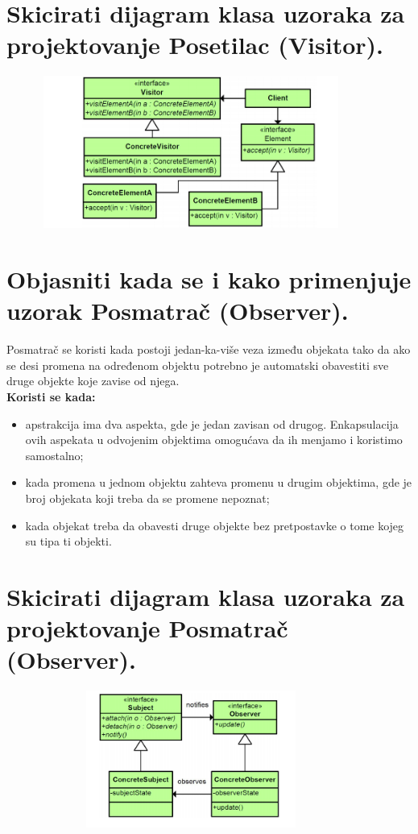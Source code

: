 \documentclass[a4paper]{article}
\begin{document}
\section{Skicirati dijagram klasa uzoraka za projektovanje Posetilac (Visitor).}
  \begin{figure}[H]
    \begin{center}
        \includegraphics[width=100mm,height=50mm]{Slike/dp_visitor.png}
    \end{center}
  \end{figure} 

\section{Objasniti kada se i kako primenjuje uzorak Posmatrač (Observer).}
  Posmatrač se koristi kada postoji jedan-ka-više veza između objekata tako da ako se desi promena 
  na određenom objektu potrebno je automatski obavestiti sve druge objekte koje zavise od njega.\\
  \textbf{Koristi se kada:}
  \begin{itemize}
    \item apstrakcija ima dva aspekta, gde je jedan zavisan od drugog. Enkapsulacija ovih aspekata
          u odvojenim objektima omogućava da ih menjamo i koristimo samostalno;
    \item kada promena u jednom objektu zahteva promenu u drugim objektima, gde je broj
          objekata koji treba da se promene nepoznat;
    \item kada objekat treba da obavesti druge objekte bez pretpostavke o tome kojeg su tipa ti objekti.
  \end{itemize}

\section{Skicirati dijagram klasa uzoraka za projektovanje Posmatrač (Observer).}
  \begin{figure}[H]
    \begin{center}
        \includegraphics[width=100mm,height=45mm]{Slike/dp_observer.png}
    \end{center}
  \end{figure} 
\end{document}
